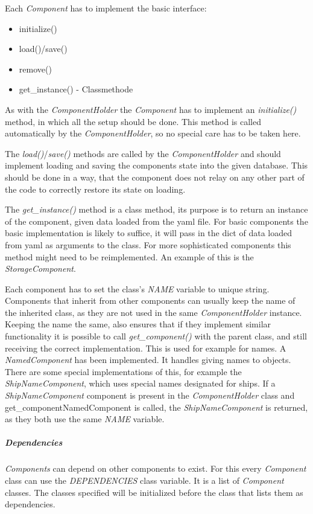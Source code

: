 Each \textit{Component} has to implement the basic interface:
\begin{itemize}
    \item initialize()
    \item load()/save()
    \item remove()
    \item get\_instance() - Classmethode
\end{itemize}
As with the \textit{ComponentHolder} the \textit{Component} has to implement an \textit{initialize()} method, in which
all the setup should be done. This method is called automatically by the \textit{ComponentHolder}, so no special care
has to be taken here.

The \textit{load()}/\textit{save()} methods are called by the \textit{ComponentHolder} and should
implement loading and saving the components state into the given database. This should be done in a way, that the
component does not relay on any other part of the code to correctly restore its state on loading.

The \textit{get\_instance()} method is a class method, its purpose is to return an instance of the component, given data loaded
from the yaml file. For basic components the basic implementation is likely to suffice, it will pass in the dict of data
loaded from yaml as arguments to the class. For more sophisticated components this method might need to be
reimplemented. An example of this is the \textit{StorageComponent}.

Each component has to set the class's \textit{NAME} variable to unique string. Components that inherit from other
components can usually keep the name of the inherited class, as they are not used in the same \textit{ComponentHolder}
instance. Keeping the name the same, also ensures that if they implement similar functionality it is possible to call
\textit{get\_component()} with the parent class, and still receiving the correct implementation. This is used for example
for names. A \textit{NamedComponent} has been implemented. It handles giving names to objects. There are some special
implementations of this, for example the \textit{ShipNameComponent}, which uses special names designated for ships. If a
\textit{ShipNameComponent} component is present in the \textit{ComponentHolder} class and get\_component{NamedComponent}
is called, the \textit{ShipNameComponent} is returned, as they both use the same \textit{NAME} variable.

\subparagraph{Dependencies}
\textit{Components} can depend on other components to exist. For this every \textit{Component} class can use the
\textit{DEPENDENCIES} class variable. It is a list of \textit{Component} classes. The classes specified will be
initialized before the class that lists them as dependencies. 

